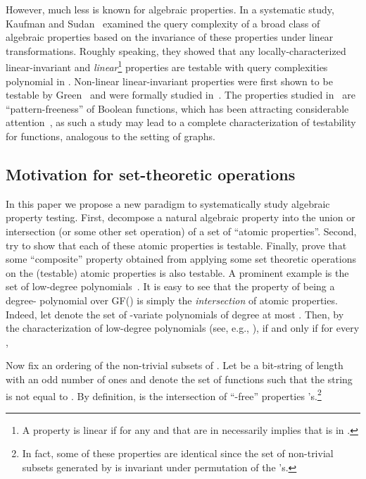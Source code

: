 \documentclass[11pt,english]{article}
\theoremstyle{definition}
\theoremstyle{remark}
\begin{document}
However, much less is known for algebraic properties. In a systematic study, 
Kaufman and Sudan~\cite{KS08} examined the query complexity
of a broad class of algebraic properties based on the invariance of
these properties under linear transformations. Roughly speaking, they
showed that any locally-characterized linear-invariant and \emph{linear}\footnote{A property  is linear if for any  and  that are in
 necessarily implies that  is in .} properties are testable with query complexities polynomial in .
Non-linear linear-invariant properties were first shown to be testable
by Green~\cite{Gre05} and were formally studied in~\cite{BCSX09}.
The properties studied in~\cite{Gre05,BCSX09} are ``pattern-freeness''
of Boolean functions, which has been attracting 
considerable attention~\cite{Gre05,BCSX09,Sha09,KSV08,BGS10}, 
as such a study may lead to a complete characterization of testability
for functions, analogous to the setting of graphs. 

\subsection{Motivation for set-theoretic operations}

In this paper we propose a new paradigm to systematically study algebraic property
testing.  First, decompose a natural algebraic property into the union
or intersection (or some other set operation) of a set of  ``atomic properties''. 
Second, try to show that each of these atomic properties is testable. 
Finally, prove that some  ``composite'' property obtained from 
applying some set theoretic operations on the
(testable) atomic properties is also testable. 
A prominent example is the set of low-degree polynomials~\cite{AKKLR03,KR04,JPRZ04}. It is easy
to see that the property of being a degree- polynomial over GF()
is simply the \emph{intersection} of  atomic properties. 
Indeed, let  denote the set of -variate
polynomials of degree at most . Then, by the characterization
of low-degree polynomials (see, e.g., \cite{AKKLR03}), 
if and only if for every , 


Now fix an ordering of the non-trivial subsets of . 
Let  be a bit-string of length  with an odd number of ones and
 denote the set of functions  such that the string 
 is not equal to .
By definition,  is the intersection of  ``-free'' properties 
's.\footnote{In fact, some of these  properties are identical 
since the set of non-trivial subsets generated by  is invariant under permutation of the 's.} 
\end{document}
